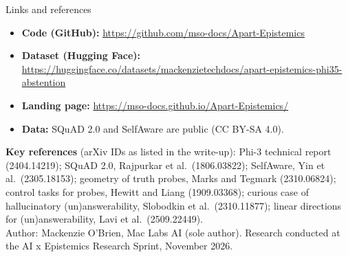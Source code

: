 \documentclass[aspectratio=169,11pt,usepdftitle=false]{beamer}
\begin{document}
\begin{frame}{Links and references}
\small
\begin{itemize}
\item \textbf{Code (GitHub):} \url{https://github.com/mso-docs/Apart-Epistemics}
\item \textbf{Dataset (Hugging Face):} \url{https://huggingface.co/datasets/mackenzietechdocs/apart-epistemics-phi35-abstention}
\item \textbf{Landing page:} \url{https://mso-docs.github.io/Apart-Epistemics/}
\item \textbf{Data:} SQuAD 2.0 and SelfAware are public (CC BY-SA 4.0).
\end{itemize}
\vspace{4pt}
\scriptsize
\textbf{Key references} (arXiv IDs as listed in the write-up):
Phi-3 technical report (2404.14219); SQuAD 2.0, Rajpurkar et al.\ (1806.03822); SelfAware, Yin et al.\ (2305.18153); geometry of truth probes, Marks and Tegmark (2310.06824); control tasks for probes, Hewitt and Liang (1909.03368); curious case of hallucinatory (un)answerability, Slobodkin et al.\ (2310.11877); linear directions for (un)answerability, Lavi et al.\ (2509.22449).\\[4pt]
Author: Mackenzie O'Brien, Mac Labs AI (sole author). Research conducted at the AI x Epistemics Research Sprint, November 2026.
\end{frame}
\end{document}
